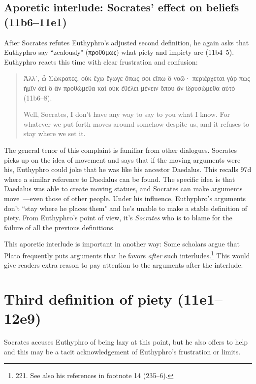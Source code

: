 \documentclass[11pt]{article}
\begin{document}
\subsection{Aporetic interlude: Socrates' effect on beliefs (11b6--11e1)}

After Socrates refutes Euthyphro's adjusted second definition, he again asks that Euthyphro say ``zealously" (προθύμως) what piety and impiety are (11b4--5).  Euthyphro reacts this time with clear frustration and confusion:

\begin{quote}
    {\g Ἀλλ᾽, ὦ Σώκρατες, οὐκ ἔχω ἔγωγε ὅπως σοι εἴπω ὃ νοῶ· περιέρχεται γάρ πως ἡμῖν ἀεὶ ὃ ἂν προθώμεθα καὶ οὐκ ἐθέλει μένειν ὅπου ἂν ἱδρυσώμεθα αὐτό} (11b6--8).

    Well, Socrates, I don't have any way to say to you what I know. For whatever we put forth moves around somehow despite us, and it refuses to stay where we set it.
\end{quote}

The general tenor of this complaint is familiar from other dialogues.  Socrates picks up on the idea of movement and says that if the moving arguments were his, Euthyphro could joke that he was like his ancestor Daedalus.  This recalls  97d where a similar reference to Daedalus can be found.  The specific idea is that Daedalus was able to create moving statues, and Socrates can make arguments move~---even those of other people.  Under his influence, Euthyphro's arguments don't ``stay where he places them" and he's unable to make a stable definition of piety.  From Euthyphro's point of view, it's \emph{Socrates} who is to blame for the failure of all the previous definitions.

This aporetic interlude is important in another way: Some scholars argue that Plato frequently puts arguments that he favors \emph{after} such interludes.\footnote{\citet{mcpherran1992} 221.  See also his references in footnote 14 (235--6).}  This would give readers extra reason to pay attention to the arguments after the interlude.

\section{Third definition of piety (11e1--12e9)}

Socrates accuses Euthyphro of being lazy at this point, but he also offers to help and this may be a tacit acknowledgement of Euthyphro's frustration or limits.
\end{document}
